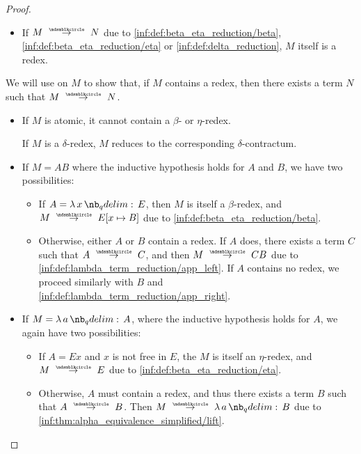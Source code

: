\begin{proof}
\begin{itemize}
    \item If \( M \pred N \) due to \ref{inf:def:beta_eta_reduction/beta}, \ref{inf:def:beta_eta_reduction/eta} or \ref{inf:def:delta_reduction}, \( M \) itself is a redex.
  \end{itemize}

  \NecessitySubProof* We will use  on \( M \) to show that, if \( M \) contains a redex, then there exists a term \( N \) such that \( M \pred N \).

  \begin{itemize}
    \item If \( M \) is atomic, it cannot contain a \( \beta \)- or \( \eta \)-redex.

    If \( M \) is a \( \delta \)-redex, \( M \) reduces to the corresponding \( \delta \)-contractum.

    \item If \( M = AB \) where the inductive hypothesis holds for \( A \) and \( B \), we have two possibilities:
    \begin{itemize}
      \item If \( A = \qabs x E \), then \( M \) is itself a \( \beta \)-redex, and \( M \pred E[x \mapsto B] \) due to \ref{inf:def:beta_eta_reduction/beta}.
      \item Otherwise, either \( A \) or \( B \) contain a redex. If \( A \) does, there exists a term \( C \) such that \( A \pred C \), and then \( M \pred CB \) due to \ref{inf:def:lambda_term_reduction/app_left}. If \( A \) contains no redex, we proceed similarly with \( B \) and \ref{inf:def:lambda_term_reduction/app_right}.
    \end{itemize}

    \item If \( M = \qabs a A \), where the inductive hypothesis holds for \( A \), we again have two possibilities:
    \begin{itemize}
      \item If \( A = Ex \) and \( x \) is not free in \( E \), the \( M \) is itself an \( \eta \)-redex, and \( M \pred E \) due to \ref{inf:def:beta_eta_reduction/eta}.

      \item Otherwise, \( A \) must contain a redex, and thus there exists a term \( B \) such that \( A \pred B \). Then \( M \pred \qabs a B \) due to \ref{inf:thm:alpha_equivalence_simplified/lift}.
    \end{itemize}
  \end{itemize}
\end{proof}


